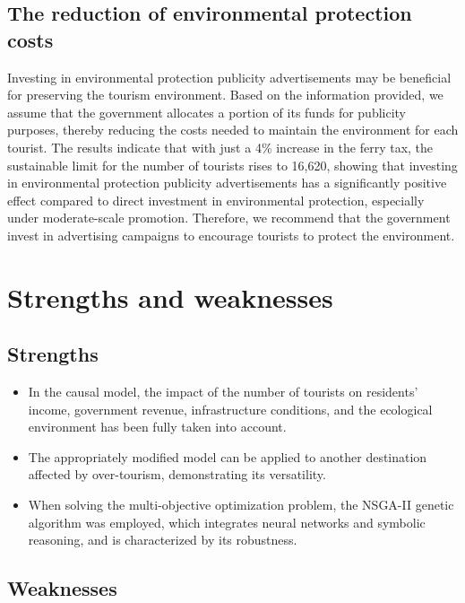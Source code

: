 \documentclass[12pt]{article}  %
\begin{document}
    \subsection{The reduction of environmental protection costs}
    Investing in environmental protection publicity advertisements may be beneficial for preserving the tourism environment. Based on the information provided, we assume that the government allocates a portion of its funds for publicity purposes, thereby reducing the costs needed to maintain the environment for each tourist. The results indicate that with just a 4\% increase in the ferry tax, the sustainable limit for the number of tourists rises to 16,620, showing that investing in environmental protection publicity advertisements has a significantly positive effect compared to direct investment in environmental protection, especially under moderate-scale promotion. Therefore, we recommend that the government invest in advertising campaigns to encourage tourists to protect the environment.
 
 \section{Strengths and weaknesses}
 
 \subsection{Strengths}
 
 \begin{itemize}
     \setlength{\parsep}{0ex} %
     \setlength{\topsep}{2ex} %
     \setlength{\itemsep}{1ex} %
     \item In the causal model, the impact of the number of tourists on residents' income, government revenue, infrastructure conditions, and the ecological environment has been fully taken into account.
     \item The appropriately modified model can be applied to another destination affected by over-tourism, demonstrating its versatility.
     \item When solving the multi-objective optimization problem, the NSGA-II genetic algorithm was employed, which integrates neural networks and symbolic reasoning, and is characterized by its robustness.
 \end{itemize}
 
 \subsection{Weaknesses}
\end{document}
